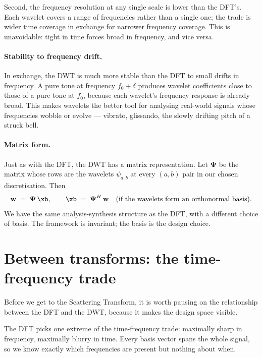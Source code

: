 Second, the frequency resolution at any single scale is lower than the
DFT's.  Each wavelet covers a range of frequencies rather than a single
one; the trade is wider time coverage in exchange for narrower
frequency coverage.  This is unavoidable: tight in time forces broad in
frequency, and vice versa.

\paragraph{Stability to frequency drift.}  In exchange, the DWT is much
more stable than the DFT to small drifts in frequency.  A pure tone at
frequency $f_0 + \delta$ produces wavelet coefficients close to those
of a pure tone at $f_0$, because each wavelet's frequency response is
already broad.  This makes wavelets the better tool for analysing
real-world signals whose frequencies wobble or evolve --- vibrato,
glissando, the slowly drifting pitch of a struck bell.

\paragraph{Matrix form.}  Just as with the DFT, the DWT has a matrix
representation.  Let $\boldsymbol\Psi$ be the matrix whose rows are the
wavelets $\psi_{a, b}$ at every $(a, b)$ pair in our chosen
discretisation.  Then
\begin{equation}
    \mathbf{w} \;=\; \boldsymbol\Psi\, \xb,
    \qquad
    \xb \;=\; \boldsymbol\Psi^H\, \mathbf{w}
    \quad\text{(if the wavelets form an orthonormal basis).}
    \label{eq:dwt_matrix}
\end{equation}
We have the same analysis-synthesis structure as the DFT, with a
different choice of basis.  The framework is invariant; the basis is
the design choice.

\section{Between transforms: the time-frequency trade}

Before we get to the Scattering Transform, it is worth pausing on the
relationship between the DFT and the DWT, because it makes the design
space visible.

The DFT picks one extreme of the time-frequency trade: maximally sharp
in frequency, maximally blurry in time.  Every basis vector spans the
whole signal, so we know exactly which frequencies are present but
nothing about when.

